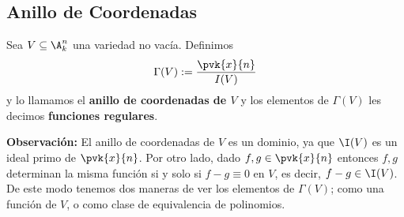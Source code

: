 \documentclass{article}
\begin{document}
\subsection{Anillo de Coordenadas}
\begin{dfn}
    Sea $V\subseteq\A_{k}^{n}$ una variedad no vacía. Definimos
    \begin{equation*}
        \Gamma(V):=\frac{\pvk{x}{n}}{I(V)}
    \end{equation*}
    y lo llamamos el \textbf{anillo de coordenadas de $V$} y los elementos de $\Gamma(V)$ les decimos
    \textbf{funciones regulares}.
\end{dfn}
\noindent\textbf{Observación:} El anillo de coordenadas de $V$ es un dominio, ya que $\I(V)$ es un
ideal primo de $\pvk{x}{n}$. Por otro lado, dado $f,g\in\pvk{x}{n}$ entonces $f,g$ determinan la
misma función si y solo si $f-g\equiv0$ en $V$, es decir, $f-g\in\I(V)$. De este modo tenemos dos
maneras de ver los elementos de $\Gamma(V)$; como una función de $V$, o como clase de equivalencia 
de polinomios.
\end{document}
